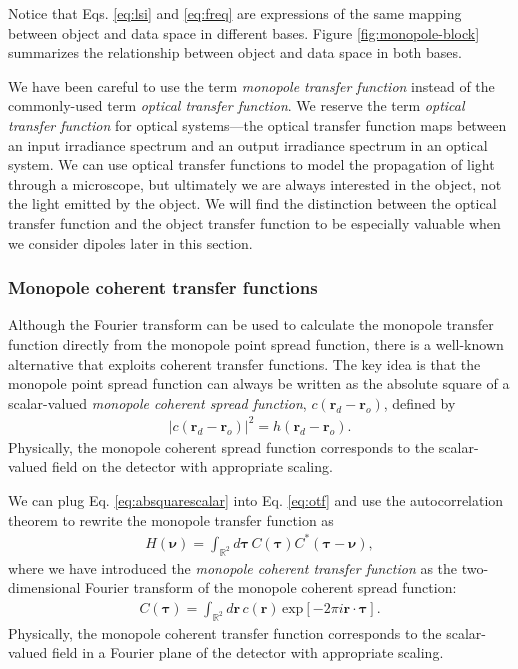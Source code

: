 \documentclass[]{osa-article}
\providecommand{\mb}[1]{\mathbf{#1}}
\providecommand{\ro}{\mathbf{\mathbf{r}}_o}
\providecommand{\rd}{\mathbf{r}_d}
\providecommand{\mbb}[1]{\mathbb{#1}}
\providecommand{\bs}[1]{\boldsymbol{#1}}
\providecommand{\bv}{\bs{\nu}}
\providecommand{\taup}{\bs{\tau}}
\begin{document}
Notice that Eqs. \eqref{eq:lsi} and \eqref{eq:freq} are expressions of the same
mapping between object and data space in different bases. Figure
\ref{fig:monopole-block} summarizes the relationship between object and data
space in both bases.

We have been careful to use the term \textit{monopole transfer function} instead
of the commonly-used term \textit{optical transfer function}. We reserve the
term \textit{optical transfer function} for optical systems---the optical
transfer function maps between an input irradiance spectrum and an output
irradiance spectrum in an optical system. We can use optical transfer functions
to model the propagation of light through a microscope, but ultimately we are
always interested in the object, not the light emitted by the object. We will
find the distinction between the optical transfer function and the object
transfer function to be especially valuable when we consider dipoles later in
this section.

\subsubsection{Monopole coherent transfer functions}
Although the Fourier transform can be used to calculate the monopole transfer
function directly from the monopole point spread function, there is a well-known
alternative that exploits coherent transfer functions. The key idea is that the
monopole point spread function can always be written as the absolute square of a
scalar-valued \textit{monopole coherent spread function}, $c(\rd - \ro)$,
defined by
\begin{align}
  |c(\rd - \ro)|^2 = h(\rd - \ro). \label{eq:absquarescalar}
\end{align}
Physically, the monopole coherent spread function corresponds to the
scalar-valued field on the detector with appropriate scaling.

We can plug Eq. \eqref{eq:absquarescalar} into Eq. \eqref{eq:otf} and use the
autocorrelation theorem to rewrite the monopole transfer function as
\begin{align}
  H(\bv) = \int_{\mbb{R}^2}d\taup\, C(\taup)C^*(\taup - \bv), 
\end{align}
where we have introduced the
\textit{monopole coherent transfer function} as the two-dimensional Fourier
transform of the monopole coherent spread function:
\begin{align}
  C(\taup) = \int_{\mbb{R}^2}d\mb{r}\, c(\mb{r})\,\text{exp}[-2\pi i\mb{r}\cdot\taup].
\end{align}
Physically, the monopole coherent transfer function corresponds to the
scalar-valued field in a Fourier plane of the detector with appropriate scaling.
\end{document}
